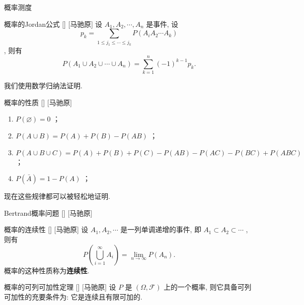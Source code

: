 \documentclass[UTF8]{ctexart}
\begin{document}
        \begin{ppt}
            {概率测度}
        \end{ppt}

        \begin{thm}
            []
            {概率的Jordan公式}
            []
            [马驰原]
            设 \(A_1,A_2,\cdots,A_n\) 是事件, 设\[p_k=\sum_{1\leq j_1\leq\cdots\leq j_k  }P(A_iA_2\cdots A_k)\], 则有
            \[P(A_1\cup A_2\cup\cdots\cup A_n)=\sum_{k=1}^{n}(-1)^{k-1}p_k.\]
        \end{thm}

        \begin{prf}
            我们使用数学归纳法证明. 
        \end{prf}

        \begin{ppt}
            []
            {概率的性质}
            []
            [马驰原]
            \begin{enumerate}
                \item  \(P(\varnothing)=0\) ；
                \item  \(P(A\cup B)=P(A)+P(B)-P(AB)\) ；
                \item  \(P(A\cup B\cup C)=P(A)+P(B)+P(C)-P(AB)-P(AC)-P(BC)+P(ABC)\) ；
                \item  \(P(\bar{A})=1-P(A)\) ；
            \end{enumerate}
        \end{ppt}

        现在这些规律都可以被轻松地证明. 

        \begin{cxmp}
            []
            {Bertrand概率问题}
            []
            [马驰原]
        \end{cxmp}

        \begin{dfn}
            []
            {概率的连续性}
            []
            [马驰原]
            设 \(A_1,A_2,\cdots\) 是一列单调递增的事件, 即 \(A_1\subset A_2\subset\cdots\) , 则有\[P\left(\bigcup_{i=1}^{\infty}A_i\right)=\lim_{n\to\infty}P(A_n).\]概率的这种性质称为\textbf{连续性}. 
        \end{dfn}
        
        \begin{thm}
            []
            {概率的可列可加性定理}
            []
            [马驰原]
            设 \(P\) 是 \((\Omega,\mathcal{F})\) 上的一个概率, 则它具备可列可加性的充要条件为: 它是连续且有限可加的. 
        \end{thm}
\end{document}
